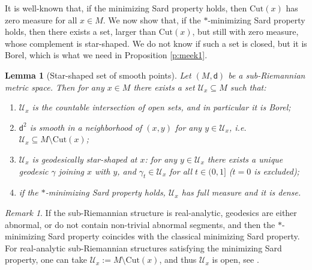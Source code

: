 \documentclass[11pt,a4paper]{article}
\theoremstyle{plain}
\newtheorem{lemma}[theorem]{Lemma}
\theoremstyle{definition}
\theoremstyle{remark}
\newtheorem{remark}[theorem]{Remark}
\numberwithin{equation}{section}
\newcommand{\Cut}{\mathrm{Cut}}
\newcommand{\sfd}{\mathsf d}
\begin{document}
It is well-known that, if the minimizing Sard property holds, then $\Cut(x)$ has zero measure for all $x\in M$. We now show that, if the $*$-minimizing Sard property holds, then there exists a set, larger than $\Cut(x)$, but still with zero measure, whose complement is star-shaped. We do not know if such a set is closed, but it is Borel, which is what we need in Proposition \ref{p:meek1}.

\begin{lemma}[Star-shaped set of smooth points]\label{lem:starsardpointofsmoothness}
Let $(M,\sfd)$ be a sub-Riemannian metric space. Then for any $x\in M$ there exists a set $\mathcal{U}_x\subseteq M$ such that:
\begin{enumerate}[label=(\roman*)]
\item \label{i:starsardpointofsmoothness1} $\mathcal{U}_x$ is the countable intersection of open sets, and in particular it is Borel;
\item \label{i:starsardpointofsmoothness2} $\sfd^2$ is smooth in a neighborhood of $(x,y)$ for any $y\in \mathcal{U}_x$, i.e.\@ $\mathcal{U}_x\subseteq M\setminus \Cut(x)$;
\item \label{i:starsardpointofsmoothness3} $\mathcal{U}_x$ is geodesically star-shaped at $x$: for any $y\in \mathcal{U}_x$ there exists a unique geodesic $\gamma$ joining $x$ with $y$, and $\gamma_t \in \mathcal{U}_x$ for all $t\in (0,1]$ ($t=0$ is excluded);
\item \label{i:starsardpointofsmoothness4} if the $*$-minimizing Sard property holds, $\mathcal{U}_x$ has full measure and it is dense.
\end{enumerate}
\end{lemma}
\begin{remark}
If the sub-Riemannian structure is real-analytic, geodesics are either abnormal, or do not contain non-trivial abnormal segments, and then the $*$-minimizing Sard property coincides with the classical minimizing Sard property. For real-analytic sub-Riemannian structures satisfying the minimizing Sard property, one can take $\mathcal{U}_x:=M\setminus \mathrm{Cut}(x)$, and thus $\mathcal{U}_x$ is open, see \cite[Prop.\@ 6]{BR-realanalMCP}.
\end{remark}
\end{document}
